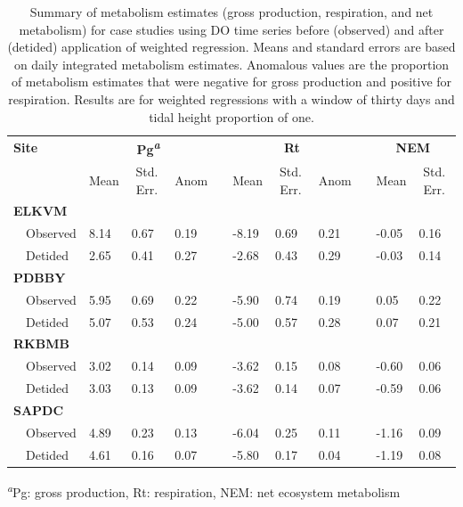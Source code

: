 \documentclass[letterpaper,12pt,oneside]{article}\usepackage[]{graphicx}\usepackage[]{color}
\begin{document}
%
\begin{table}[!tbp]
\caption{Summary of metabolism estimates (gross production, respiration, and net metabolism) for case studies using \ac{DO} time series before (observed) and after (detided) application of weighted regression.  Means and standard errors are based on daily integrated metabolism estimates.  Anomalous values are the proportion of metabolism estimates that were negative for gross production and positive for respiration.  Results are for weighted regressions with a window of thirty days and tidal height proportion of one.\label{tab:case_res}} 
\begin{center}
\begin{tabular}{llllclllcll}
\hline\hline
\multicolumn{1}{l}{\bfseries Site}&\multicolumn{3}{c}{\bfseries Pg\textsuperscript{\textit{a}}}&\multicolumn{1}{c}{\bfseries }&\multicolumn{3}{c}{\bfseries Rt}&\multicolumn{1}{c}{\bfseries }&\multicolumn{2}{c}{\bfseries NEM}\tabularnewline
\cline{2-4} \cline{6-8} \cline{10-11}
\multicolumn{1}{l}{}&\multicolumn{1}{c}{Mean}&\multicolumn{1}{c}{Std. Err.}&\multicolumn{1}{c}{Anom}&\multicolumn{1}{c}{}&\multicolumn{1}{c}{Mean}&\multicolumn{1}{c}{Std. Err.}&\multicolumn{1}{c}{Anom}&\multicolumn{1}{c}{}&\multicolumn{1}{c}{Mean}&\multicolumn{1}{c}{Std. Err.}\tabularnewline
\hline
{\bfseries ELKVM}&&&&&&&&&&\tabularnewline
~~Observed&8.14&0.67&0.19&&-8.19&0.69&0.21&&-0.05&0.16\tabularnewline
~~Detided&2.65&0.41&0.27&&-2.68&0.43&0.29&&-0.03&0.14\tabularnewline
\hline
{\bfseries PDBBY}&&&&&&&&&&\tabularnewline
~~Observed&5.95&0.69&0.22&&-5.90&0.74&0.19&& 0.05&0.22\tabularnewline
~~Detided&5.07&0.53&0.24&&-5.00&0.57&0.28&& 0.07&0.21\tabularnewline
\hline
{\bfseries RKBMB}&&&&&&&&&&\tabularnewline
~~Observed&3.02&0.14&0.09&&-3.62&0.15&0.08&&-0.60&0.06\tabularnewline
~~Detided&3.03&0.13&0.09&&-3.62&0.14&0.07&&-0.59&0.06\tabularnewline
\hline
{\bfseries SAPDC}&&&&&&&&&&\tabularnewline
~~Observed&4.89&0.23&0.13&&-6.04&0.25&0.11&&-1.16&0.09\tabularnewline
~~Detided&4.61&0.16&0.07&&-5.80&0.17&0.04&&-1.19&0.08\tabularnewline
\hline
\end{tabular}
\end{center}
\textsuperscript{\textit{a}}Pg: gross production, Rt: respiration, NEM: net ecosystem metabolism\end{table}
\end{document}

